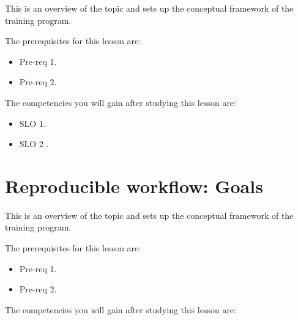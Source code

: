 This is an overview of the topic and sets up the conceptual framework of the training program.




The prerequisites for this lesson are: 




\begin{itemize}
    \item Pre-req 1.
\end{itemize}

\begin{itemize}
    \item Pre-req 2.
\end{itemize}




The competencies you will gain after studying this lesson are: 




\begin{itemize}
    \item SLO 1.
\end{itemize}

\begin{itemize}
    \item SLO 2 .
\end{itemize}

\section{Reproducible workflow: Goals}
\label{sec:reproducible-workflow-goals}

This is an overview of the topic and sets up the conceptual framework of the training program.




The prerequisites for this lesson are: 




\begin{itemize}
    \item Pre-req 1.
\end{itemize}

\begin{itemize}
    \item Pre-req 2.
\end{itemize}




The competencies you will gain after studying this lesson are: 




